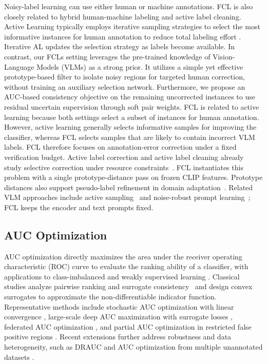 \documentclass[10pt,twocolumn,letterpaper]{article}
\begin{document}
Noisy-label learning can use either human or machine annotations. FCL is also closely related to hybrid human-machine labeling and active label cleaning. Active Learning typically employs iterative sampling strategies to select the most informative instances for human annotation to reduce total labeling effort \cite{jan2014active, qiu2023mcal}. Iterative AL updates the selection strategy as labels become available. In contrast, our FCLs setting leverages the pre-trained knowledge of Vision-Language Models (VLMs) as a strong prior. It utilizes a simple yet effective prototype-based filter to isolate noisy regions for targeted human correction, without training an auxiliary selection network. Furthermore, we propose an AUC-based consistency objective on the remaining uncorrected instances to use residual uncertain supervision through soft pair weights. FCL is related to active learning because both settings select a subset of instances for human annotation. However, active learning generally selects informative samples for improving the classifier, whereas FCL selects samples that are likely to contain incorrect VLM labels. FCL therefore focuses on annotation-error correction under a fixed verification budget. Active label correction and active label cleaning already study selective correction under resource constraints~\cite{kremer2018ralc,bernhardt2022activecleaning}. FCL instantiates this problem with a single prototype-distance pass on frozen CLIP features. Prototype distances also support pseudo-label refinement in domain adaptation~\cite{zhang2021proda}. Related VLM approaches include active sampling~\cite{bang2024pcb} and noise-robust prompt learning~\cite{wei2024deft,pan2025nlprompt}; FCL keeps the encoder and text prompts fixed.

\subsection{AUC Optimization}
AUC optimization directly maximizes the area under the receiver operating characteristic (ROC) curve to evaluate the ranking ability of a classifier, with applications to class-imbalanced and weakly supervised learning \cite{yang2022survey}. Classical studies analyze pairwise ranking and surrogate consistency~\cite{gao2015consistency} and design convex surrogates to approximate the non-differentiable indicator function. Representative methods include stochastic AUC optimization with linear convergence \cite{natole2019stochauc}, large-scale deep AUC maximization with surrogate losses \cite{yuan2021deepauc}, federated AUC optimization \cite{yuan2021fdam}, and partial AUC optimization in restricted false positive regions \cite{yao2022partialauc}. Recent extensions further address robustness and data heterogeneity, such as DRAUC \cite{dai2023drauc} and AUC optimization from multiple unannotated datasets \cite{xie2024umlauc}. 
\end{document}
